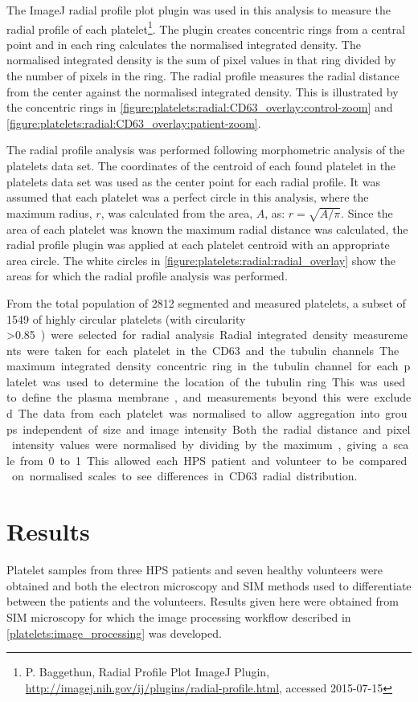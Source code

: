 The ImageJ radial profile plot plugin was used in this analysis to measure the radial profile of each platelet\footnote{P. Baggethun, Radial Profile Plot ImageJ Plugin, \url{http://imagej.nih.gov/ij/plugins/radial-profile.html}, accessed 2015-07-15}. The plugin creates concentric rings from a central point and in each ring calculates the normalised integrated density. The normalised integrated density is the sum of pixel values in that ring divided by the number of pixels in the ring. The radial profile measures the radial distance from the center against the normalised integrated density. This is illustrated by the concentric rings in \autoref{figure:platelets:radial:CD63_overlay:control-zoom} and \autoref{figure:platelets:radial:CD63_overlay:patient-zoom}.

The radial profile analysis was performed following morphometric analysis of the platelets data set. The coordinates of the centroid of each found platelet in the platelets data set was used as the center point for each radial profile. It was assumed that each platelet was a perfect circle in this analysis, where the maximum radius, $r$, was calculated from the area, $A$, as: $r=\sqrt{A/\pi}$. Since the area of each platelet was known the maximum radial distance was calculated, the radial profile plugin was applied at each platelet centroid with an appropriate area circle. The white circles in \autoref{figure:platelets:radial:radial_overlay} show the areas for which the radial profile analysis was performed.

From the total population of 2812 segmented and measured platelets, a subset of 1549 of highly circular platelets (with circularity \textgreater\SI{0.85}) were selected for radial analysis. Radial integrated density measurements were taken for each platelet in the CD63 and the tubulin channels. The maximum integrated density concentric ring in the tubulin channel for each platelet was used to determine the location of the tubulin ring. This was used to define the plasma membrane, and measurements beyond this were excluded.

The data from each platelet was normalised to allow aggregation into groups independent of size and image intensity. Both the radial distance and pixel intensity values were normalised by dividing by the maximum, giving a scale from 0 to 1. This allowed each HPS patient and volunteer to be compared on normalised scales to see differences in CD63 radial distribution.

\section{Results}
\label{platelets:results}
Platelet samples from three HPS patients and seven healthy volunteers were obtained and both the electron microscopy and SIM methods used to differentiate between the patients and the volunteers. Results given here were obtained from SIM microscopy for which the image processing workflow described in \autoref{platelets:image_processing} was developed.

